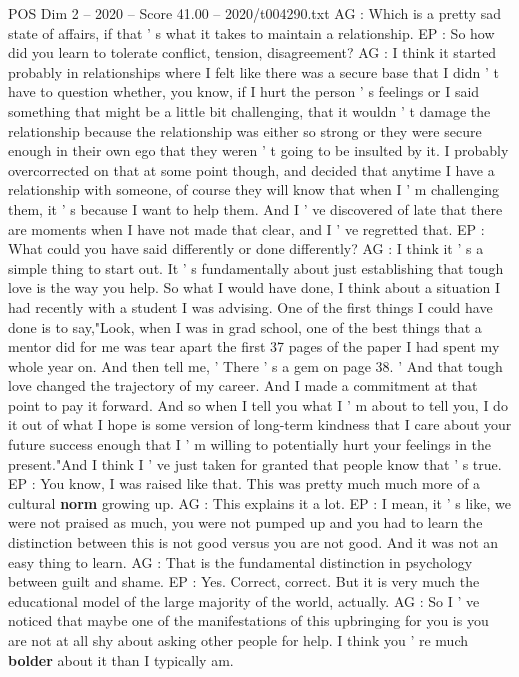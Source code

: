 \begin{textsample}{POS Dim 2 – 2020 – Score 41.00 – 2020/t004290.txt}
AG : Which is a pretty sad state of affairs, if that ' s what it takes to maintain a relationship.
EP : So how did you learn to tolerate conflict, tension, disagreement?
AG : I think it started probably in relationships where I felt like there was a secure base that I didn ' t have to question whether, you know, if I hurt the person ' s feelings or I said something that might be a little bit challenging, that it wouldn ' t damage the relationship because the relationship was either so strong or they were secure enough in their own ego that they weren ' t going to be insulted by it.
I probably overcorrected on that at some point though, and decided that anytime I have a relationship with someone, of course they will know that when I ' m challenging them, it ' s because I want to help them.
And I ' ve discovered of late that there are moments when I have not made that clear, and I ' ve regretted that.
EP : What could you have said differently or done differently?
AG : I think it ' s a simple thing to start out.
It ' s fundamentally about just establishing that tough love is the way you help.
So what I would have done, I think about a situation I had recently with a student I was advising.
One of the first things I could have done is to say,"Look, when I was in grad school, one of the best things that a mentor did for me was tear apart the first 37 pages of the paper I had spent my whole year on.
And then tell me, ' There ' s a gem on page 38. ' And that tough love changed the trajectory of my career.
And I made a commitment at that point to pay it forward.
And so when I tell you what I ' m about to tell you, I do it out of what I hope is some version of long-term kindness that I care about your future success enough that I ' m willing to potentially hurt your feelings in the present."And I think I ' ve just taken for granted that people know that ' s true.
EP : You know, I was raised like that.
This was pretty much much more of a cultural \textbf{norm} growing up.
AG : This explains it a lot.
EP : I mean, it ' s like, we were not praised as much, you were not pumped up and you had to learn the distinction between this is not good versus you are not good.
And it was not an easy thing to learn.
AG : That is the fundamental distinction in psychology between guilt and shame.
EP : Yes.
Correct, correct.
But it is very much the educational model of the large majority of the world, actually.
AG : So I ' ve noticed that maybe one of the manifestations of this upbringing for you is you are not at all shy about asking other people for help.
I think you ' re much \textbf{bolder} about it than I typically am.

\end{textsample}
